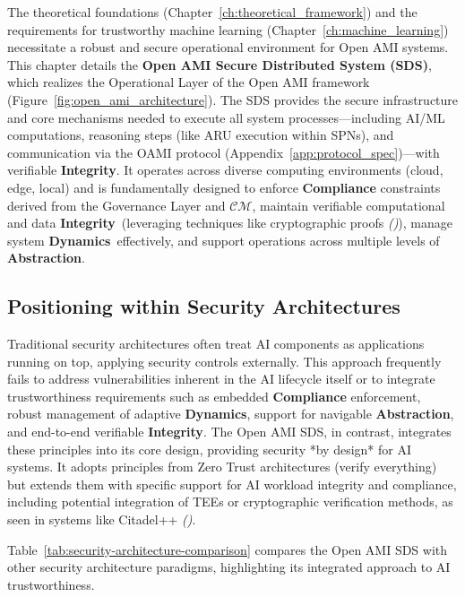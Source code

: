 \documentclass[12pt,a4paper]{report}
\renewcommand{\citep}[1]{\textit{\scriptsize{(\cite{#1})}}}
\newcommand{\Integrity}{\textbf{Integrity}}
\newcommand{\Abstraction}{\textbf{Abstraction}}
\newcommand{\Dynamics}{\textbf{Dynamics}}
\begin{document}
	The theoretical foundations (Chapter~\ref{ch:theoretical_framework}) and the requirements for trustworthy machine learning (Chapter~\ref{ch:machine_learning}) necessitate a robust and secure operational environment for Open AMI systems. This chapter details the \textbf{Open AMI Secure Distributed System (SDS)}, which realizes the Operational Layer of the Open AMI framework (Figure~\ref{fig:open_ami_architecture}). The SDS provides the secure infrastructure and core mechanisms needed to execute all system processes—including AI/ML computations, reasoning steps (like ARU execution within SPNs), and communication via the OAMI protocol (Appendix~\ref{app:protocol_spec})—with verifiable \Integrity. It operates across diverse computing environments (cloud, edge, local) and is fundamentally designed to enforce \textbf{Compliance} constraints derived from the Governance Layer and $\mathcal{CM}$, maintain verifiable computational and data \Integrity\ (leveraging techniques like cryptographic proofs \citep{Peng2025ZKMLSurvey, Jia2021ProofOfLearning}), manage system \Dynamics\ effectively, and support operations across multiple levels of \Abstraction.
	
	\subsection{Positioning within Security Architectures} %
	\label{sec:4-1-1} %
	
	Traditional security architectures often treat AI components as applications running on top, applying security controls externally. This approach frequently fails to address vulnerabilities inherent in the AI lifecycle itself or to integrate trustworthiness requirements such as embedded \textbf{Compliance} enforcement, robust management of adaptive \Dynamics, support for navigable \Abstraction, and end-to-end verifiable \Integrity. The Open AMI SDS, in contrast, integrates these principles into its core design, providing security *by design* for AI systems. It adopts principles from Zero Trust architectures (verify everything) but extends them with specific support for AI workload integrity and compliance, including potential integration of TEEs or cryptographic verification methods, as seen in systems like Citadel++ \citep{AdditionalCitationRef54, Citadel_PlusPlus_2025}.
	
	Table~\ref{tab:security-architecture-comparison} compares the Open AMI SDS with other security architecture paradigms, highlighting its integrated approach to AI trustworthiness.
	
\end{document}
